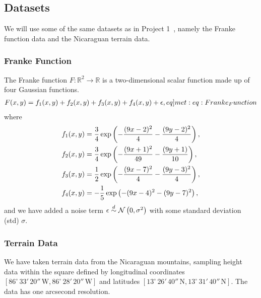 \subsection{Datasets}
    We will use some of the same datasets as in Project 1~\citep{Project1}, namely the Franke function data and the Nicaraguan terrain data.
    \subsubsection{Franke Function}
        The Franke function $F: \mathbb{R}^2 \to \mathbb{R}$ is a two-dimensional scalar function made up of four Gaussian functions.
        \begin{align}
            F(x,y) = f_1(x,y) + f_2(x,y) + f_3(x,y) + f_4(x,y) + \epsilon, \label[eq]{met:eq:Franke_Function}
        \end{align}
        where
        \begin{subequations}
            \begin{align}
                f_1(x,y) &= \frac{3}{4}\operatorname{exp}\left( -\frac{(9x-2)^2}{4} - \frac{(9y-2)^2}{4} \right), \\
                f_2(x,y) &= \frac{3}{4}\operatorname{exp}\left( -\frac{(9x+1)^2}{49} - \frac{(9y+1)}{10} \right), \\
                f_3(x,y) &= \frac{1}{2}\operatorname{exp}\left( -\frac{(9x-7)^2}{4} - \frac{(9y-3)^2}{4} \right), \\
                f_4(x,y) &= -\frac{1}{5}\operatorname{exp}\left( -(9x-4)^2 - (9y-7)^2 \right),
            \end{align}
        \end{subequations}
        and we have added a noise term $\epsilon \overset{d}{\sim} \operatorname{\mathcal{N}}\left(0,\sigma^2\right)$ with some standard deviation (std) $\sigma$.

    \subsubsection{Terrain Data}
        We have taken terrain data from the Nicaraguan mountains, sampling height data within the square defined by longitudinal coordinates $[86^\circ\,33'\,20''\,\text{W}, 86^\circ\,28'\,20''\,\text{W}]$ and latitudes $[13^\circ\,26'\,40''\,\text{N}, 13^\circ\,31'\,40''\,\text{N}]$. The data has one arcsecond resolution.

